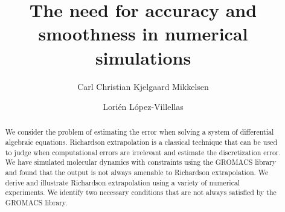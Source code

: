 \documentclass[runningheads]{llncs}
\begin{document}
%
\title{The need for accuracy and smoothness in numerical simulations}
%
%
\author{Carl Christian Kjelgaard Mikkelsen  \and
  Lori{\'e}n L{\'o}pez-Villellas 
}
%
%

%
\maketitle %
%
\begin{abstract} We consider the problem of estimating the error when solving a system of differential algebraic equations. Richardson extrapolation is a classical technique that can be used to judge when computational errors are irrelevant and estimate the discretization error. We have simulated molecular dynamics with constraints using the GROMACS library and found that the output is not always amenable to Richardson extrapolation. We derive and illustrate Richardson extrapolation using a variety of numerical experiments. We identify two necessary conditions that are not always satisfied by the GROMACS library.
\end{abstract}
%
%
%
\end{document}
